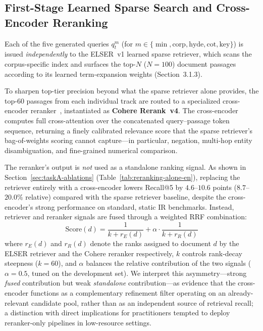 \subsection{First-Stage Learned Sparse Search and Cross-Encoder Reranking}
\label{subsec:reranking}

Each of the five generated queries $q_t^m$ (for $m \in \{\min, \text{corp}, \text{hyde}, \text{cot}, \text{key}\}$) is issued \emph{independently} to the ELSER~v1 learned sparse retriever, which scans the corpus-specific index and surfaces the top-$N$ ($N{=}100$) document passages according to its learned term-expansion weights (Section~3.1.3).

To sharpen top-tier precision beyond what the sparse retriever alone provides, the top-$60$ passages from each individual track are routed to a specialized cross-encoder reranker~\citep{nogueira2019passage, nogueira2020monot5}, instantiated as \textbf{Cohere Rerank~v4}. The cross-encoder computes full cross-attention over the concatenated query--passage token sequence, returning a finely calibrated relevance score that the sparse retriever's bag-of-weights scoring cannot capture---in particular, negation, multi-hop entity disambiguation, and fine-grained numerical comparison.

The reranker's output is \emph{not} used as a standalone ranking signal. As shown in Section~\ref{sec:taskA-ablations} (Table~\ref{tab:reranking-alone-en}), replacing the retriever entirely with a cross-encoder lowers Recall@5 by $4.6$--$10.6$ points ($8.7$--$20.0\%$ relative) compared with the sparse retriever baseline, despite the cross-encoder's strong performance on standard, static IR benchmarks. Instead, retriever and reranker signals are fused through a weighted RRF combination:
\begin{equation}
\text{Score}(d) = \frac{1}{k + r_{E}(d)} + \alpha \cdot \frac{1}{k + r_{R}(d)}
\label{eq:hybrid-rerank}
\end{equation}
where $r_E(d)$ and $r_R(d)$ denote the ranks assigned to document $d$ by the ELSER retriever and the Cohere reranker respectively, $k$ controls rank-decay steepness ($k{=}60$), and $\alpha$ balances the relative contribution of the two signals ($\alpha{=}0.5$, tuned on the development set). We interpret this asymmetry---strong \emph{fused} contribution but weak \emph{standalone} contribution---as evidence that the cross-encoder functions as a complementary refinement filter operating on an already-relevant candidate pool, rather than as an independent source of retrieval recall; a distinction with direct implications for practitioners tempted to deploy reranker-only pipelines in low-resource settings.

